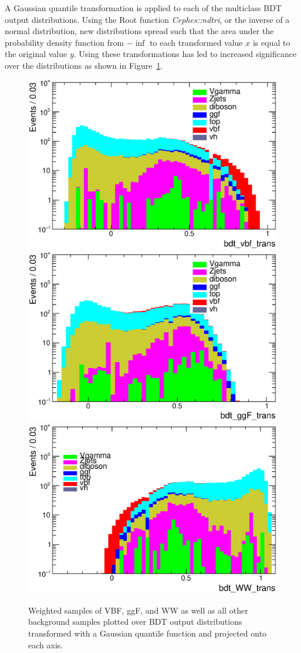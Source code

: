 A Gaussian quantile transformation is applied to each of the multiclass BDT output distributions. Using the Root function \textit{Cephes::ndtri}, or the inverse of a normal distribution, new distributions spread such that the area under the probability density function from $-\inf$ to each transformed value $x$ is equal to the original value $y$. Using these transformations has led to increased significance over the distributions as shown in Figure~\ref{fig:multiclassBDTresulttrans}.

\begin{figure}[!htbp]
\centering
  \centering
  \includegraphics[width=.3\linewidth]{Pictures/finalBDT_def/weightedmulticlassvbftrans.eps} \quad
  \includegraphics[width=.3\linewidth]{Pictures/finalBDT_def/weightedmulticlassggftrans.eps} \quad
  \includegraphics[width=.3\linewidth]{Pictures/finalBDT_def/weightedmulticlassdibosontrans.eps}
\caption{Weighted samples of VBF, ggF, and WW as well as all other background samples plotted over BDT output distributions transformed with a Gaussian quantile function and projected onto each axis.}
\label{fig:multiclassBDTresulttrans}
\end{figure}

